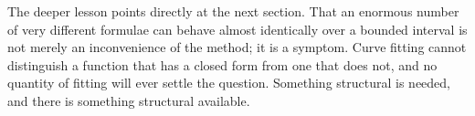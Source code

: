 The deeper lesson points directly at the next section. That an enormous number of
very different formulae can behave almost identically over a bounded interval is not
merely an inconvenience of the method; it is a symptom. Curve fitting cannot
distinguish a function that has a closed form from one that does not, and no
quantity of fitting will ever settle the question. Something structural is needed,
and there is something structural available.
